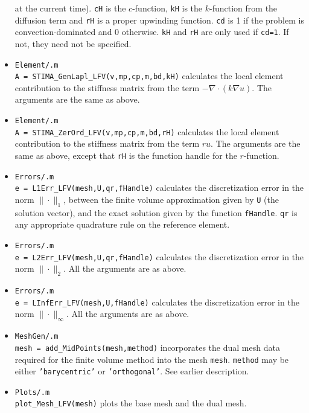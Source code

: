 \begin{itemize}
    at the current time). {\tt cH} is the $c$-function, {\tt kH} is the
    $k$-function from the diffusion term and {\tt rH} is a proper upwinding
    function. {\tt cd} is 1 if the problem is convection-dominated and 0
    otherwise. {\tt kH} and {\tt rH} are only used if {\tt cd=1}. If not,
    they need not be specified.
\item {\tt Element/.m} \\
    {\tt A = STIMA\_GenLapl\_LFV(v,mp,cp,m,bd,kH)} calculates the local
    element contribution to the stiffness matrix from the term
    $-\nabla\cdot(k\nabla u)$. The arguments are the same as above.
\item {\tt Element/.m} \\
    {\tt A = STIMA\_ZerOrd\_LFV(v,mp,cp,m,bd,rH)} calculates the local
    element contribution to the stiffness matrix from the term
    $ru$. The arguments are the same as above, except that {\tt rH} is
    the function handle for the $r$-function.
\item {\tt Errors/.m} \\
    {\tt e = L1Err\_LFV(mesh,U,qr,fHandle)} calculates the discretization
    error in the norm $\|\cdot\|_1$, between the finite volume approximation
    given by {\tt U} (the solution vector), and the exact solution given by
    the function {\tt fHandle}. {\tt qr} is any appropriate quadrature rule
    on the reference element.
\item {\tt Errors/.m} \label{L2Err_LFV} \\
    {\tt e = L2Err\_LFV(mesh,U,qr,fHandle)} calculates the discretization
    error in the norm $\|\cdot\|_2$. All the arguments are as above.
\item {\tt Errors/.m} \label{LInfErr_LFV} \\
    {\tt e = LInfErr\_LFV(mesh,U,fHandle)} calculates the discretization
    error in the norm $\|\cdot\|_\infty$. All the arguments are as above.
\item {\tt MeshGen/.m} \\
    {\tt mesh = add\_MidPoints(mesh,method)} incorporates the dual mesh
    data required for the finite volume method into the mesh {\tt mesh}.
    {\tt method} may be either {\tt 'barycentric'} or {\tt 'orthogonal'}.
    See earlier description.
\item {\tt Plots/.m} \\
    {\tt plot\_Mesh\_LFV(mesh)} plots the base mesh and the dual mesh.
\end{itemize}


